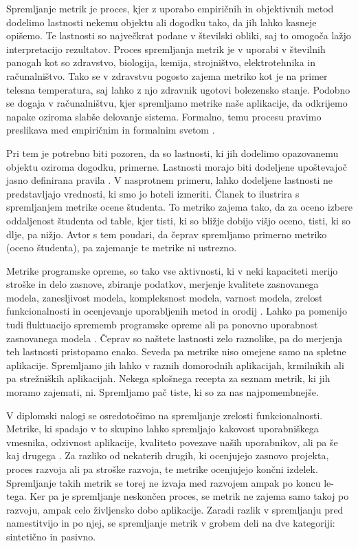 \documentclass[a4paper, 12pt]{book}
\begin{document}
Spremljanje metrik je proces, kjer z uporabo empiričnih in objektivnih metod dodelimo lastnosti nekemu objektu ali dogodku tako, da jih lahko kasneje opišemo. Te lastnosti so največkrat podane v številski obliki, saj to omogoča lažjo interpretacijo rezultatov. Proces spremljanja metrik je v uporabi v številnih panogah kot so zdravstvo, biologija, kemija, strojništvo, elektrotehnika in računalništvo. Tako se v zdravstvu pogosto zajema metriko kot je na primer telesna temperatura, saj lahko z njo zdravnik ugotovi bolezensko stanje. Podobno se dogaja v računalništvu, kjer spremljamo metrike naše aplikacije, da odkrijemo napake oziroma slabše delovanje sistema. Formalno, temu procesu pravimo preslikava med empiričnim in formalnim svetom \cite{se_metrics}.

Pri tem je potrebno biti pozoren, da so lastnosti, ki jih dodelimo opazovanemu objektu oziroma dogodku, primerne. Lastnosti morajo biti dodeljene upoštevajoč jasno definirana pravila \cite{software_metrics}. V nasprotnem primeru, lahko dodeljene lastnosti ne predstavljajo vrednosti, ki smo jo hoteli izmeriti. Članek \cite{se_metrics} to ilustrira s spremljanjem metrike ocene študenta. To metriko zajema tako, da za oceno izbere oddaljenost študenta od table, kjer tisti, ki so bližje dobijo višjo oceno, tisti, ki so dlje, pa nižjo. Avtor s tem poudari, da čeprav spremljamo primerno metriko (oceno študenta), pa zajemanje te metrike ni ustrezno.

Metrike programske opreme, so tako vse aktivnosti, ki v neki kapaciteti merijo stroške in delo zasnove, zbiranje podatkov, merjenje kvalitete zasnovanega modela, zanesljivost modela, kompleksnost modela, varnost modela, zrelost funkcionalnosti in ocenjevanje uporabljenih metod in orodij \cite{software_metrics} \cite{usefulness_soft_metrics} \cite{assigning_weights_quality} \cite{fault_prediction_metrics}. Lahko pa pomenijo tudi fluktuacijo sprememb programske opreme ali pa ponovno uporabnost zasnovanega modela \cite{metrics_fluctuation} \cite{reusability_metrics}. Čeprav so naštete lastnosti zelo raznolike, pa do merjenja teh lastnosti pristopamo enako. Seveda pa metrike niso omejene samo na spletne aplikacije. Spremljamo jih lahko v raznih domorodnih aplikacijah, krmilnikih ali pa strežniških aplikacijah. Nekega splošnega recepta za seznam metrik, ki jih moramo zajemati, ni. Spremljamo pač tiste, ki so za nas najpomembnejše.

V diplomski nalogi se osredotočimo na spremljanje zrelosti funkcionalnosti. Metrike, ki spadajo v to skupino lahko spremljajo kakovost uporabniškega vmesnika, odzivnost aplikacije, kvaliteto povezave naših uporabnikov, ali pa še kaj drugega \cite{wba_quality}. Za razliko od nekaterih drugih, ki ocenjujejo zasnovo projekta, proces razvoja ali pa stroške razvoja, te metrike ocenjujejo končni izdelek. Spremljanje takih metrik se torej ne izvaja med razvojem ampak po koncu le-tega. Ker pa je spremljanje neskončen proces, se metrik ne zajema samo takoj po razvoju, ampak celo življensko dobo aplikacije. Zaradi razlik v spremljanju pred namestitvijo in po njej, se spremljanje metrik v grobem deli na dve kategoriji: sintetično in pasivno.
\end{document}
